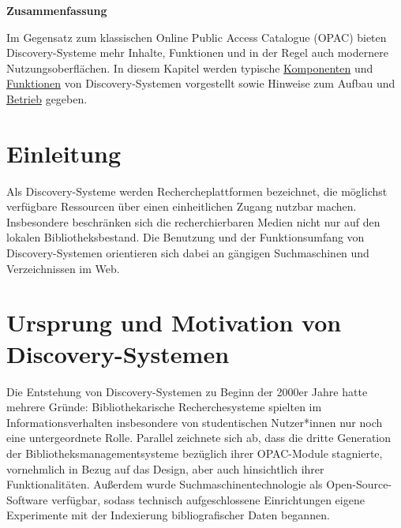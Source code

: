 \documentclass[
  11pt,
  letterpaper,
  DIV=11,
  twoside]{scrreprt}
\begin{document}
\begin{tcolorbox}[enhanced jigsaw, leftrule=.75mm, toprule=.15mm, left=2mm, opacityback=0, arc=.35mm, colback=white, breakable, colframe=quarto-callout-note-color-frame, rightrule=.15mm, bottomrule=.15mm]
\begin{minipage}[t]{5.5mm}
\textcolor{quarto-callout-note-color}{\faInfo}
\end{minipage}%
\begin{minipage}[t]{\textwidth - 5.5mm}

\vspace{-3mm}\textbf{Zusammenfassung}\vspace{3mm}

Im Gegensatz zum klassischen Online Public Access Catalogue ({OPAC})
bieten Discovery-Systeme mehr Inhalte, Funktionen und in der Regel auch
modernere Nutzungsoberflächen. In diesem Kapitel werden typische
\hyperref[komponenten]{Komponenten} und
\hyperref[funktionen]{Funktionen} von Discovery-Systemen vorgestellt
sowie Hinweise zum Aufbau und \hyperref[betrieb]{Betrieb} gegeben.

\end{minipage}%
\end{tcolorbox}

\section{Einleitung}\label{einleitung-7}

Als Discovery-Systeme werden Rechercheplattformen bezeichnet, die
möglichst verfügbare Ressourcen über einen einheitlichen Zugang nutzbar
machen. Insbesondere beschränken sich die recherchierbaren Medien nicht
nur auf den lokalen Bibliotheksbestand. Die Benutzung und der
Funktionsumfang von Discovery-Systemen orientieren sich dabei an
gängigen Suchmaschinen und Verzeichnissen im Web.

\section{Ursprung und Motivation von
Discovery-Systemen}\label{ursprung-und-motivation-von-discovery-systemen}

Die Entstehung von Discovery-Systemen zu Beginn der 2000er Jahre hatte
mehrere Gründe: Bibliothekarische Recherchesysteme spielten im
Informationsverhalten insbesondere von studentischen Nutzer*innen nur
noch eine untergeordnete Rolle. Parallel zeichnete sich ab, dass die
dritte Generation der Bibliotheksmanagementsysteme bezüglich ihrer
OPAC-Module stagnierte, vornehmlich in Bezug auf das Design, aber auch
hinsichtlich ihrer Funktionalitäten. Außerdem wurde
Suchmaschinentechnologie als Open-Source-Software verfügbar, sodass
technisch aufgeschlossene Einrichtungen eigene Experimente mit der
Indexierung bibliografischer Daten begannen.
\end{document}
